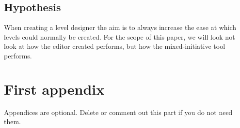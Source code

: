 \documentclass[journal]{IEEEtran}
\begin{document}
\subsection{Hypothesis}\label{hyp}
When creating a level designer the aim is to always increase the ease at which levels could normally be created. For the scope of this paper, we will look not look at how the editor created performs, but how the mixed-initiative tool performs. 





\appendices
\section{First appendix}
Appendices are optional. Delete or comment out this part if you do not need them.

\end{document}
